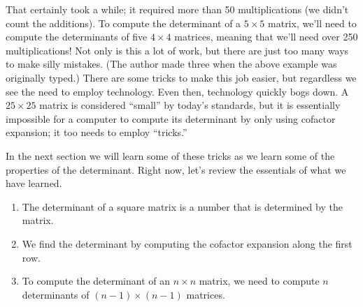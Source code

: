 \medskip

That certainly took a while; it required more than 50 multiplications (we didn't count the additions). To compute the determinant of a $5\times5$ matrix, we'll need to compute the determinants of five $4\times 4$ matrices, meaning that we'll need over 250 multiplications! Not only is this a lot of work, but there are just too many ways to make silly mistakes. (The author made three when the above example was originally typed.) There are some tricks to make this job easier, but regardless we see the need to employ technology. Even then, technology quickly bogs down. A $25 \times 25$ matrix is considered ``small'' by today's standards, but it is essentially impossible for a computer to compute its determinant by only using cofactor expansion; it too needs to employ ``tricks.''


In the next section we will learn some of these tricks as we learn some of the properties of the determinant. Right now, let's review the essentials of what we have learned. 
	\begin{enumerate}
	\item		The determinant of a square matrix is a number that is determined by the matrix.
	\item		We find the determinant by computing the cofactor expansion along the first row.
	\item		To compute the determinant of an $n\times n$ matrix, we need to compute $n$ determinants of $(n-1)\times(n-1)$ matrices.
	\end{enumerate}
	



